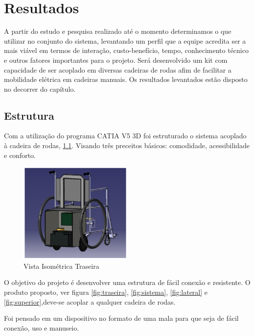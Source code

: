 \chapter[Resultados]{Resultados}

A partir do estudo e pesquisa realizado até o momento determinamos o que utilizar no conjunto do sistema, levantando um perfil que a equipe acredita ser a mais viável em termos de interação, custo-benefício, tempo, conhecimento técnico e outros fatores importantes para o projeto. Será desenvolvido um kit com capacidade de ser acoplado em diversas cadeiras de rodas afim de facilitar a mobilidade elétrica em cadeiras manuais. Os resultados levantados estão disposto no decorrer do capítulo.

\section{Estrutura}

Com a utilização do programa CATIA V5 3D foi estruturado o sistema acoplado à cadeira de rodas, \ref{fig:vista_isometrica_traseira}. Visando três preceitos básicos: comodidade, acessibilidade e conforto.

\begin{figure}[!htb]
\centering
\includegraphics[width=0.5\textwidth]{figuras/estrutura/vista_isometrica_traseira}
\caption{Vista Isométrica Traseira}
\label{fig:vista_isometrica_traseira}
\end{figure}

O objetivo do projeto é desenvolver uma estrutura de fácil conexão e resistente. O produto proposto, ver figura \ref{fig:traseira}, \ref{fig:sistema}, \ref{fig:lateral} e \ref{fig:superior},deve-se acoplar a qualquer cadeira de rodas.

Foi pensado em um dispositivo no formato de uma mala para que seja de fácil conexão, uso e manuseio.

